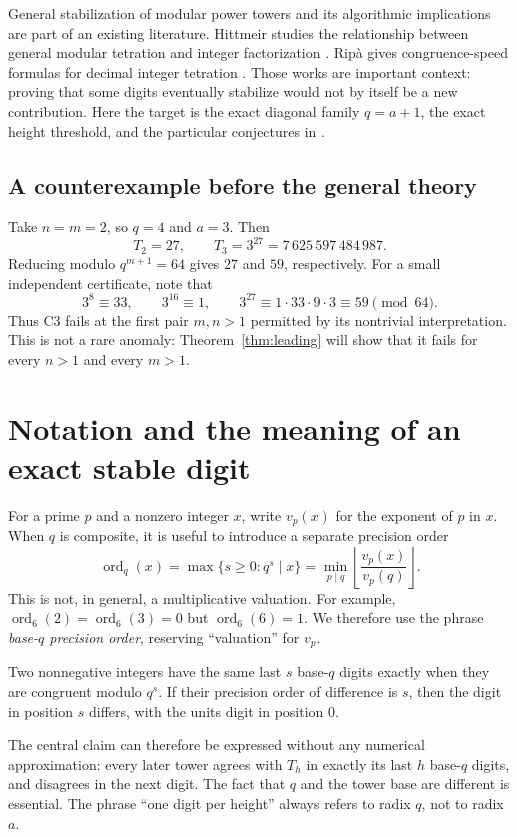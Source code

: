 \documentclass[11pt,a4paper]{article}
\numberwithin{equation}{section}
\theoremstyle{plain}
\theoremstyle{definition}
\newcommand{\ordq}{\operatorname{ord}_q}
\begin{document}
General stabilization of modular power towers and its algorithmic
implications are part of an existing literature.  Hittmeir studies the
relationship between general modular tetration and integer factorization
\cite{hittmeir}.  Rip\`a gives congruence-speed formulas for decimal
integer tetration \cite{ripa}.  Those works are important context:
proving that some digits eventually stabilize would not by itself be a
new contribution.  Here the target is the exact diagonal family
$q=a+1$, the exact height threshold, and the particular conjectures in
\cite{oeis}.

\subsection{A counterexample before the general theory}
Take $n=m=2$, so $q=4$ and $a=3$.  Then
\[
 T_2=27,\qquad T_3=3^{27}=7\,625\,597\,484\,987.
\]
Reducing modulo $q^{m+1}=64$ gives $27$ and $59$, respectively.
For a small independent certificate, note that
\[
 3^8\equiv33,\qquad 3^{16}\equiv1,\qquad
 3^{27}\equiv1\cdot33\cdot9\cdot3\equiv59\pmod{64}.
\]
Thus C3 fails at the first pair $m,n>1$ permitted by its nontrivial
interpretation.  This is not a rare anomaly: Theorem~\ref{thm:leading}
will show that it fails for every $n>1$ and every $m>1$.

\section{Notation and the meaning of an exact stable digit}

For a prime $p$ and a nonzero integer $x$, write $v_p(x)$ for the exponent
of $p$ in $x$.  When $q$ is composite, it is useful to introduce a
separate precision order
\begin{equation}\label{eq:ordq}
 \ordq(x)=\max\{s\ge0:q^s\mid x\}
 =\min_{p\mid q}\left\lfloor\frac{v_p(x)}{v_p(q)}\right\rfloor.
\end{equation}
This is not, in general, a multiplicative valuation.  For example,
$\operatorname{ord}_6(2)=\operatorname{ord}_6(3)=0$ but
$\operatorname{ord}_6(6)=1$.  We therefore use the phrase
\emph{base-$q$ precision order}, reserving ``valuation'' for $v_p$.

Two nonnegative integers have the same last $s$ base-$q$ digits exactly
when they are congruent modulo $q^s$.  If their precision order of
difference is $s$, then the digit in position $s$ differs, with the
units digit in position $0$.

The central claim can therefore be expressed without any numerical
approximation: every later tower agrees with $T_h$ in exactly its last
$h$ base-$q$ digits, and disagrees in the next digit.  The fact that
$q$ and the tower base are different is essential.  The phrase
``one digit per height'' always refers to radix $q$, not to radix $a$.
\end{document}
